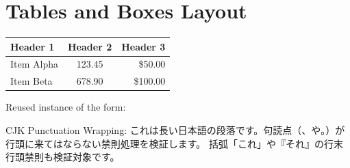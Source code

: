 \documentclass{article}
\edef\formid{\the\pdflastxform}
\def\putreusableform{\pdfrefxform\formid}
\def\putreusableform{\copy\reusableform}
\begin{document}
\section*{Tables and Boxes Layout}

\begin{tabular}{|l|c|r|}
\hline
Header 1 & Header 2 & Header 3 \\
\hline
Item Alpha & 123.45 & \$50.00 \\
Item Beta  & 678.90 & \$100.00 \\
\hline
\end{tabular}

\bigskip
{}

\bigskip
\noindent\putreusableform

\bigskip
\noindent Reused instance of the form:

\noindent\putreusableform

\bigskip
CJK Punctuation Wrapping:
これは長い日本語の段落です。句読点（、や。）が行頭に来てはならない禁則処理を検証します。
括弧「これ」や『それ』の行末行頭禁則も検証対象です。
\end{document}
